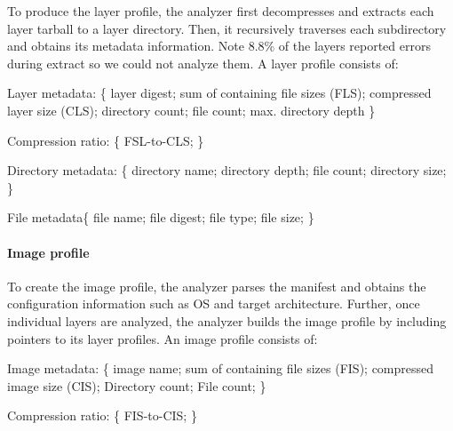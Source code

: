 %
To produce the layer profile, the analyzer first decompresses and extracts each
layer tarball to a layer directory.
%
Then, it recursively traverses each subdirectory and obtains
its metadata information. Note 8.8\% of the layers reported errors during
extract so we could not analyze them.
%
A layer profile consists of:
\begin{compactenumerate}
\item Layer metadata: \{
layer digest; 
sum of containing file sizes (FLS); 
compressed layer size (CLS); 
directory count;
file count;
max. directory depth
\}

\item Compression ratio: \{
FSL-to-CLS;
\}

\item Directory metadata: \{
directory name;
directory depth;
file count;
directory size;
\}

\item File metadata\{
file name;
file digest;
file type;
file size;
\}
\end{compactenumerate}


\paragraph{Image profile}

To create the image profile, the analyzer parses the manifest
and obtains the configuration information such as OS and target architecture.
Further, once individual layers are analyzed, the analyzer builds the image
profile by including pointers to its layer profiles. An image profile consists of:
\begin{compactenumerate}

\item Image metadata: \{
image name; 
sum of containing file sizes (FIS); 
compressed image size (CIS); 
Directory count;
File count;
\}

\item Compression ratio: \{
FIS-to-CIS;
\}

\end{compactenumerate}

